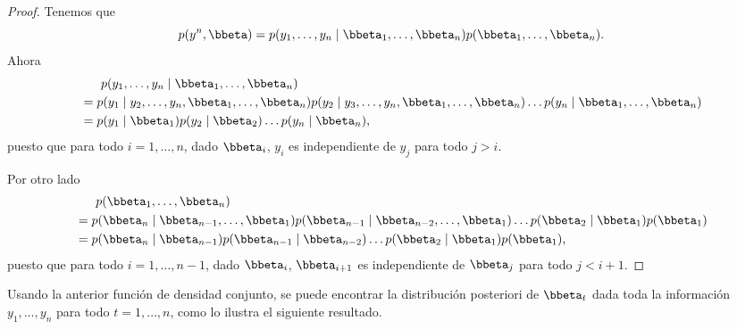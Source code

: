 \begin{proof}
Tenemos que
\begin{equation*}
p(y^n,\bbeta)=p(y_1,\ldots,y_n \mid \bbeta_1,\ldots,\bbeta_n)p(\bbeta_1,\ldots,\bbeta_n).
\end{equation*}
Ahora
\begin{align*}
&\ \ \ \ \ p(y_1,\ldots,y_n \mid \bbeta_1,\ldots,\bbeta_n)\\
&=p(y_1 \mid y_2,\ldots,y_n,\bbeta_1,\ldots,\bbeta_n)p(y_2 \mid y_3,\ldots,y_n,\bbeta_1,\ldots,\bbeta_n)\ldots p(y_n \mid \bbeta_1,\ldots,\bbeta_n)\\
&=p(y_1 \mid \bbeta_1)p(y_2 \mid \bbeta_2)\ldots p(y_n \mid \bbeta_n),
\end{align*}
puesto que para todo $i=1,\ldots,n$, dado $\bbeta_i$, $y_i$ es independiente de $y_j$ para todo $j>i$.

Por otro lado
\begin{align*}
&\ \ \ \ \ p(\bbeta_1,\ldots,\bbeta_n)\\
&=p(\bbeta_n \mid \bbeta_{n-1},\ldots,\bbeta_1)p(\bbeta_{n-1} \mid \bbeta_{n-2},\ldots,\bbeta_1)\ldots p(\bbeta_2 \mid \bbeta_1)p(\bbeta_1)\\
&=p(\bbeta_n \mid \bbeta_{n-1})p(\bbeta_{n-1} \mid \bbeta_{n-2})\ldots p(\bbeta_2 \mid \bbeta_1)p(\bbeta_1),
\end{align*}
puesto que para todo $i=1,\ldots,n-1$, dado $\bbeta_i$, $\bbeta_{i+1}$ es independiente de $\bbeta_j$ para todo $j<i+1$.
\end{proof}
Usando la anterior función de densidad conjunto, se puede encontrar la distribución posteriori de $\bbeta_t$ dada toda la información $y_1,\ldots,y_n$ para todo $t=1,\ldots,n$, como lo ilustra el siguiente resultado.
